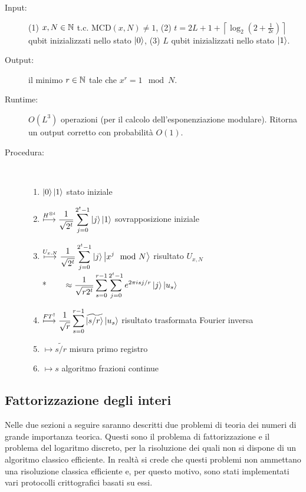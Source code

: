 \begin{algo}\*
\begin{description}
  \item [Input:] (1) $x, N \in \mathbb{N}$ t.c. MCD$(x,N) \neq 1$, (2) $t = 2L + 1 + {\left\lceil \log_2 \left(2 + \frac{1}{2\epsilon} \right) \right\rceil}$ qubit inizializzati nello stato $\ket{0}$, (3) $L$ qubit inizializzati nello stato $\ket{1}$.
  \item [Output:] il minimo $r \in \mathbb{N}$ tale che $x^r = 1 \mod N$.
  \item [Runtime:] $O(L^3)$ operazioni (per il calcolo dell'esponenziazione modulare). Ritorna un output corretto con probabilità $O(1)$.
  \newpage
  \item [Procedura:] \ 
    \begin{enumerate}
     \item ${\displaystyle\ket{0}\ket{1}}$
     \hfill {\small stato iniziale}
     \item ${\displaystyle\stackrel{H^{\otimes t}}{\longmapsto} \frac{1}{\sqrt{2^t}} \sum_{j=0}^{2^t-1} \ket{j}\ket{1}}$
     \hfill {\small sovrapposizione iniziale}
     \item ${\displaystyle\stackrel{U_{x,N}}{\longmapsto} \frac{1}{\sqrt{2^t}} \sum_{j=0}^{2^t-1} \ket{j} \ket{x^j \mod N}}$
     \hfill {\small risultato $U_{x,N}$}\\*
     \ \ ${\displaystyle\quad \approx \frac{1}{\sqrt{r2^t}} \sum_{s=0}^{r-1}\sum_{j=0}^{2^t-1} e^{2 \pi i s j / r} \ket{j} \ket{u_s}}$
     \item ${\displaystyle\stackrel{FT^\dag}{\longmapsto} \frac{1}{\sqrt{r}}\sum_{s=0}^{r-1} \widetilde{\ket{s/r}}\ket{u_s}}$
     \hfill {\small risultato trasformata Fourier inversa}
     \item ${\displaystyle\longmapsto \widetilde{s/r}}$
     \hfill {\small misura primo registro}
     \item ${\displaystyle\longmapsto s}$
     \hfill {\small algoritmo frazioni continue}
    \end{enumerate}
 \end{description}
\end{algo}

\subsection{Fattorizzazione degli interi}\label{sec:factoring}
Nelle due sezioni a seguire saranno descritti due problemi di teoria dei numeri di grande importanza teorica.
Questi sono il problema di fattorizzazione e il problema del logaritmo discreto, per la risoluzione dei quali non si dispone di un algoritmo classico efficiente.
In realtà si crede che questi problemi non ammettano una risoluzione classica efficiente e, per questo motivo, sono stati implementati vari protocolli crittografici basati su essi.

